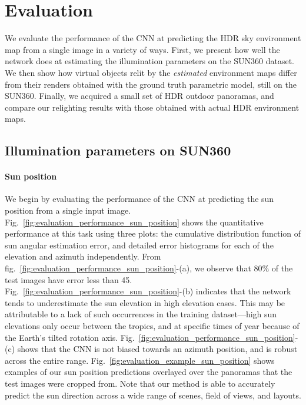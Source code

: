 \section{Evaluation}
\label{sec:evaluation}

We evaluate the performance of the CNN at predicting the HDR sky environment map from a single image in a variety of ways. First, we present how well the network does at estimating the illumination parameters on the SUN360 dataset. We then show how virtual objects relit by the \emph{estimated} environment maps differ from their renders obtained with the ground truth parametric model, still on the SUN360. Finally, we acquired a small set of HDR outdoor panoramas, and compare our relighting results with those obtained with actual HDR environment maps. 

\subsection{Illumination parameters on SUN360}

\paragraph{Sun position}

We begin by evaluating the performance of the CNN at predicting the sun position from a single input image. Fig.~\ref{fig:evaluation_performance_sun_position} shows the quantitative performance at this task using three plots: the cumulative distribution function of sun angular estimation error, and detailed error histograms for each of the elevation and azimuth independently. From fig.~\ref{fig:evaluation_performance_sun_position}-(a), we observe that 80\% of the test images have error less than 45\degree. Fig.~\ref{fig:evaluation_performance_sun_position}-(b) indicates that the network tends to underestimate the sun elevation in high elevation cases. This may be attributable to a lack of such occurrences in the training dataset---high sun elevations only occur between the tropics, and at specific times of year because of the Earth's tilted rotation axis. Fig.~\ref{fig:evaluation_performance_sun_position}-(c) shows that the CNN is not biased towards an azimuth position, and is robust across the entire range. Fig.~\ref{fig:evaluation_example_sun_position} shows examples of our sun position predictions overlayed over the panoramas that the test images were cropped from. Note that our method is able to accurately predict the sun direction across a wide range of scenes, field of views, and layouts.

